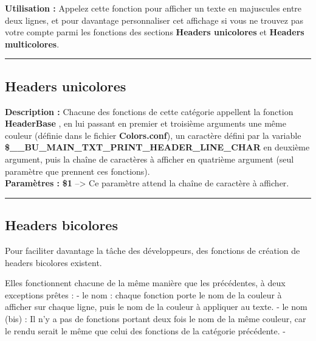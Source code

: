 \documentclass[a4paper,10pt]{article}
\begin{document}
\textbf{Utilisation :}\linebreak
Appelez cette fonction pour afficher un texte en majuscules entre deux lignes, et pour davantage personnaliser cet affichage si vous ne trouvez pas votre compte parmi les fonctions des sections \color{green}\textbf{Headers unicolores }\color{white} et \color{green}\textbf{Headers multicolores}\color{white}.\\[1\baselineskip]


\color{green}\par\noindent\rule{\textwidth}{0.4pt}\color{white}

\color{green}
\subsection{Headers unicolores}\color{white}
\textbf{Description :}\linebreak
Chacune des fonctions de cette catégorie appellent la fonction \color{mauve}\textbf{HeaderBase }\color{white}, en lui passant en premier et troisième arguments une même couleur (définie dans le fichier \color{lime}\textbf{Colors.conf}\color{white}), un caractère défini par la variable \color{orange}\textbf{\$\_\_BU\_MAIN\_TXT\_PRINT\_HEADER\_LINE\_CHAR }\color{white} en deuxième argument, puis la chaîne de caractères à afficher en quatrième argument (seul paramètre que prennent ces fonctions).\\[1\baselineskip]

\textbf{Paramètres :}\linebreak
\color{orange}\textbf{\$1 }\color{white} --> Ce paramètre attend la chaîne de caractère à afficher.

\color{green}\par\noindent\rule{\textwidth}{0.4pt}\color{white}

\color{green}
\subsection{Headers bicolores}\color{white}
Pour faciliter davantage la tâche des développeurs, des fonctions de création de headers bicolores existent.

Elles fonctionnent chacune de la même manière que les précédentes, à deux exceptions prêtes :\linebreak
	- le nom : chaque fonction porte le nom de la couleur à afficher sur chaque ligne, puis le nom de la couleur à appliquer au texte.\linebreak
	- le nom (bis) : Il n'y a pas de fonctions portant deux fois le nom de la même couleur, car le rendu serait le même que celui des fonctions de la catégorie précédente.\linebreak
	- 
\end{document}

